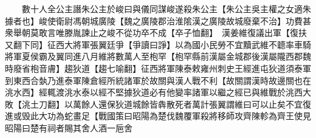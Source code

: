　　數十人全公主譖朱公主於峻曰與儀同謀峻遂殺朱公主【朱公主吳主權之女適朱據者也】峻使衛尉馮朝城廣陵【魏之廣陵郡治淮隂漢之廣陵故城廢棄不治】功費甚衆舉朝莫敢言唯滕胤諫止之峻不從功卒不成【卒子恤翻】　漢姜維復議出軍【復扶又翻下同】征西大將軍張翼廷爭【爭讀曰諍】以為國小民勞不宜黷武維不聼率車騎將軍夏侯霸及翼同進八月維將數萬人至枹罕【枹罕縣前漢屬金城郡後漢屬隴西郡魏時廢省枹音膚】趨狄道【趨七喻翻】征西將軍陳泰敕雍州刺史王經進屯狄道須泰軍到東西合埶乃進泰軍陳倉經所統諸軍於故關與漢人戰不利【故關謂漢時故邊關也在洮水西】經輒渡洮水泰以經不堅據狄道必有他變率諸軍以繼之經已與維戰於洮西大敗【洮土刀翻】以萬餘人還保狄道城餘皆犇散死者萬計張翼謂維曰可以止矣不宜復進或毁此大功為蛇畫足【戰國策曰昭陽為楚伐魏覆軍殺將移師攻齊陳軫為齊王使見昭陽曰楚有祠者賜其舍人酒一巵舍